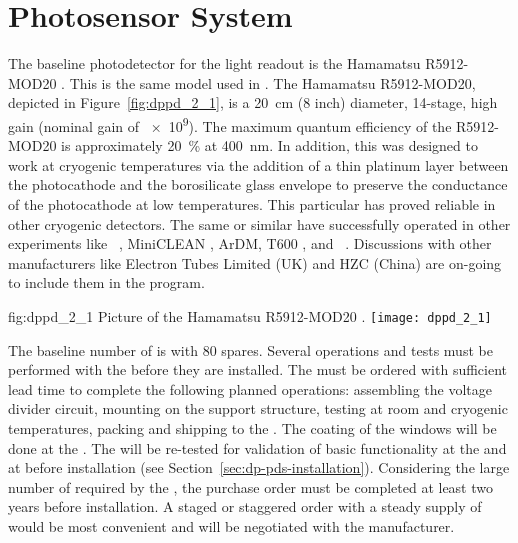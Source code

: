 \section{Photosensor System}
\label{sec:dp-pds-photosensors}

The baseline photodetector for the light readout is the Hamamatsu R5912-MOD20 . This is the same model used in . The Hamamatsu R5912-MOD20, depicted in  Figure~\ref{fig:dppd_2_1}, is a \SI{20}{cm} (8 inch) diameter, 14-stage, high gain  (nominal gain of \num{e9}). The maximum quantum efficiency of the R5912-MOD20  is approximately \SI{20}{\%} at \SI{400}{\nano\m}. In addition, this  was designed to work at cryogenic temperatures via the addition of a thin platinum layer between the photocathode and the borosilicate glass envelope to preserve the conductance of the photocathode at low temperatures. This particular  has proved reliable in other cryogenic detectors. The same or similar  have successfully operated in other \lar experiments like ~\cite{microboone}, MiniCLEAN \cite{miniclean}, ArDM,  T600 \cite{icarus}, and ~\cite{protoDUNDP-tdr}. Discussions with other manufacturers like Electron Tubes Limited (UK) \cite{electrontubeslim} and HZC (China) \cite{hzc} are on-going to include them in the program.

\begin{dunefigure}{fig:dppd_2_1}
{Picture of the Hamamatsu R5912-MOD20  \cite{hamamatsu-5912}.}
\texttt{[image: dppd\_2\_1]}
\end{dunefigure}

The baseline number of  is \dpnumpmtch with \num{80} spares.  Several operations and tests must be performed with the  before they are installed. The  must be ordered with sufficient lead time to complete the following planned operations: assembling the voltage divider circuit, mounting on the support structure, testing at room and cryogenic temperatures, packing and shipping to the . The  coating of the  windows will be done at the . The  will be re-tested for validation of basic functionality at the  and at \surf before installation (see Section~\ref{sec:dp-pds-installation}). Considering the large number of  required by the \dual {}, the purchase order must be completed at least two years before installation. A staged or staggered order with a steady supply of  would be most convenient and will be negotiated with the manufacturer.


